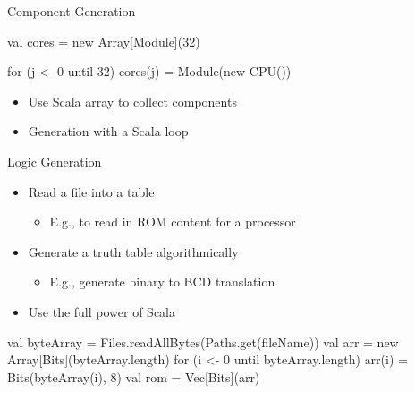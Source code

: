 \begin{frame}[fragile]{Component Generation}
\begin{chisel}
val cores = new Array[Module](32)

for (j <- 0 until 32)
  cores(j) = Module(new CPU())
\end{chisel}
\begin{itemize}
\item Use Scala array to collect components
\item Generation with a Scala loop
\end{itemize}
\end{frame}

\begin{frame}[fragile]{Logic Generation}
\begin{itemize}
\item Read a file into a table
\begin{itemize}
\item E.g., to read in ROM content for a processor
\end{itemize}
\item Generate a truth table algorithmically
\begin{itemize}
\item E.g., generate binary to BCD translation
\end{itemize}
\item Use the full power of Scala
\end{itemize}
\begin{chisel}
val byteArray = Files.readAllBytes(Paths.get(fileName))
val arr = new Array[Bits](byteArray.length)
for (i <- 0 until byteArray.length) {
  arr(i) = Bits(byteArray(i), 8)
}
val rom = Vec[Bits](arr)
\end{chisel}
\end{frame}

